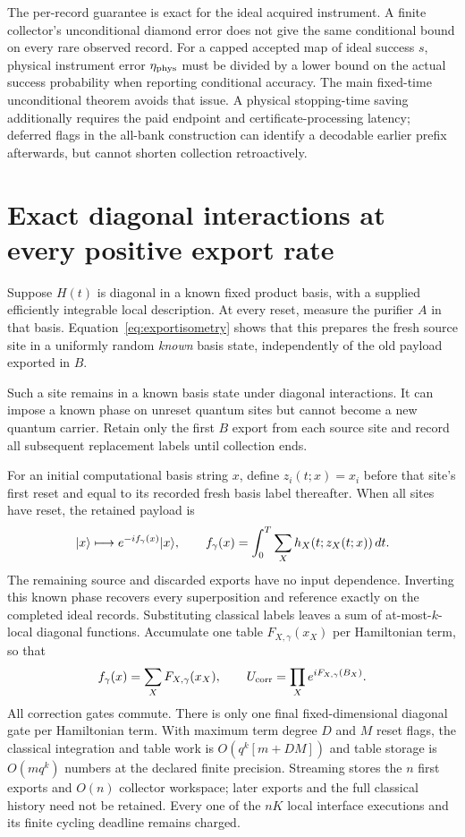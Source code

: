 \documentclass[11pt,a4paper]{article}
\begin{document}
The per-record guarantee is exact for the ideal acquired instrument. A finite collector's unconditional diamond error does not give the same conditional bound on every rare observed record. For a capped accepted map of ideal success $s$, physical instrument error $\eta_{\rm phys}$ must be divided by a lower bound on the actual success probability when reporting conditional accuracy. The main fixed-time unconditional theorem avoids that issue. A physical stopping-time saving additionally requires the paid endpoint and certificate-processing latency; deferred flags in the all-bank construction can identify a decodable earlier prefix afterwards, but cannot shorten collection retroactively.

\section{Exact diagonal interactions at every positive export rate}

Suppose $H(t)$ is diagonal in a known fixed product basis, with a supplied efficiently integrable local description. At every reset, measure the purifier $A$ in that basis. Equation~\eqref{eq:exportisometry} shows that this prepares the fresh source site in a uniformly random \emph{known} basis state, independently of the old payload exported in $B$.

Such a site remains in a known basis state under diagonal interactions. It can impose a known phase on unreset quantum sites but cannot become a new quantum carrier. Retain only the first $B$ export from each source site and record all subsequent replacement labels until collection ends.

For an initial computational basis string $x$, define $z_i(t;x)=x_i$ before that site's first reset and equal to its recorded fresh basis label thereafter. When all sites have reset, the retained payload is
\begin{equation}
\lvert x\rangle\longmapsto e^{-if_\gamma(x)}\lvert x\rangle,\qquad
f_\gamma(x)=\int_0^T\sum_X h_X(t;z_X(t;x))\,dt.
\end{equation}
The remaining source and discarded exports have no input dependence. Inverting this known phase recovers every superposition and reference exactly on the completed ideal records. Substituting classical labels leaves a sum of at-most-$k$-local diagonal functions. Accumulate one table $F_{X,\gamma}(x_X)$ per Hamiltonian term, so that
\begin{equation}
f_\gamma(x)=\sum_XF_{X,\gamma}(x_X),\qquad
U_{\rm corr}=\prod_Xe^{iF_{X,\gamma}(B_X)}.
\end{equation}
All correction gates commute. There is only one final fixed-dimensional diagonal gate per Hamiltonian term. With maximum term degree $D$ and $M$ reset flags, the classical integration and table work is $O(q^k[m+DM])$ and table storage is $O(mq^k)$ numbers at the declared finite precision. Streaming stores the $n$ first exports and $O(n)$ collector workspace; later exports and the full classical history need not be retained. Every one of the $nK$ local interface executions and its finite cycling deadline remains charged.
\end{document}
